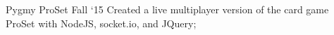 \project
    {Pygmy ProSet}
    {Fall `15}
    {
        Created a live multiplayer version of the card game ProSet with NodeJS, socket.io, and
        JQuery;
    }
